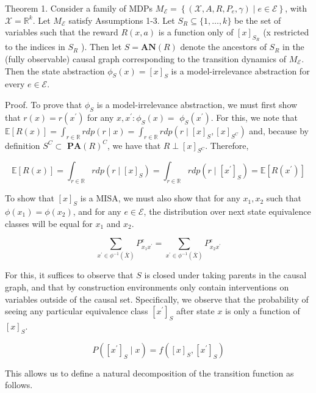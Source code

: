 \documentclass[10pt]{article}
\begin{document}
Theorem 1. Consider a family of MDPs $M_{\mathcal{E}}=\left\{\left(\mathcal{X}, A, R, P_{e}, \gamma\right) \mid e \in \mathcal{E}\right\}$, with $\mathcal{X}=\mathbb{R}^{k}$. Let $M_{\mathcal{E}}$ satisfy Assumptions 1-3. Let $S_{R} \subseteq\{1, \ldots, k\}$ be the set of variables such that the reward $R(x, a)$ is a function only of $[x]_{S_{R}}$ (x restricted to the indices in $S_{R}$ ). Then let $S=\boldsymbol{A} \boldsymbol{N}(R)$ denote the ancestors of $S_{R}$ in the (fully observable) causal graph corresponding to the transition dynamics of $M_{\mathcal{E}}$. Then the state abstraction $\phi_{S}(x)=[x]_{S}$ is a model-irrelevance abstraction for every $e \in \mathcal{E}$.

Proof. To prove that $\phi_{S}$ is a model-irrelevance abstraction, we must first show that $r(x)=r\left(x^{\prime}\right)$ for any $x, x^{\prime}: \phi_{S}(x)=$ $\phi_{S}\left(x^{\prime}\right)$. For this, we note that $\mathbb{E}[R(x)]=\int_{r \in \mathbb{R}} r d p(r \mid x)=\int_{r \in \mathbb{R}} r d p\left(r \mid[x]_{S},[x]_{S^{C}}\right)$ and, because by definition $S^{C} \subset$ $\mathbf{P A}(R)^{C}$, we have that $R \perp[x]_{S^{C}}$. Therefore,

\[
\mathbb{E}[R(x)]=\int_{r \in \mathbb{R}} r d p\left(r \mid[x]_{S}\right)=\int_{r \in \mathbb{R}} r d p\left(r \mid\left[x^{\prime}\right]_{S}\right)=\mathbb{E}\left[R\left(x^{\prime}\right)\right]
\]

To show that $[x]_{S}$ is a MISA, we must also show that for any $x_{1}, x_{2}$ such that $\phi\left(x_{1}\right)=\phi\left(x_{2}\right)$, and for any $e \in \mathcal{E}$, the distribution over next state equivalence classes will be equal for $x_{1}$ and $x_{2}$.

\[
\sum_{x^{\prime} \in \phi^{-1}(\bar{X})} P_{x_{1} x^{\prime}}^{e}=\sum_{x^{\prime} \in \phi^{-1}(\bar{X})} P_{x_{2} x^{\prime}}^{e}
\]

For this, it suffices to observe that $S$ is closed under taking parents in the causal graph, and that by construction environments only contain interventions on variables outside of the causal set. Specifically, we observe that the probability of seeing any particular equivalence class $\left[x^{\prime}\right]_{S}$ after state $x$ is only a function of $[x]_{S}$.

\[
P\left(\left[x^{\prime}\right]_{S} \mid x\right)=f\left([x]_{S},\left[x^{\prime}\right]_{S}\right)
\]

This allows us to define a natural decomposition of the transition function as follows.
\end{document}
